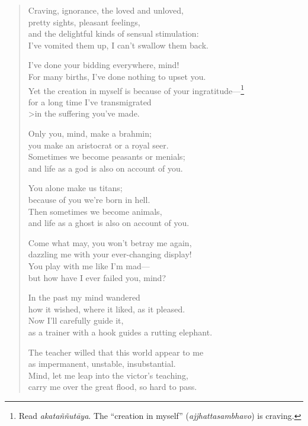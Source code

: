 \documentclass[12pt,openany]{book}%
\begin{document}
\begin{verse}
Craving, ignorance, the loved and unloved, \\
pretty sights, pleasant feelings, \\
and the delightful kinds of sensual stimulation: \\
I’ve vomited them up, I can’t swallow them back. 

I’ve done your bidding everywhere, mind! \\
For many births, I’ve done nothing to upset you. \\
Yet the creation in myself is because of your ingratitude—\footnote{Read \textit{\textsanskrit{akataññutāya}}. The “creation in myself” (\textit{ajjhattasambhavo}) is craving. } \\
for a long time I’ve transmigrated \\>in the suffering you’ve made. 

Only you, mind, make a brahmin; \\
you make an aristocrat or a royal seer. \\
Sometimes we become peasants or menials; \\
and life as a god is also on account of you. 

You alone make us titans; \\
because of you we’re born in hell. \\
Then sometimes we become animals, \\
and life as a ghost is also on account of you. 

Come what may, you won’t betray me again, \\
dazzling me with your ever-changing display! \\
You play with me like I’m mad—\\
but how have I ever failed you, mind? 

In the past my mind wandered \\
how it wished, where it liked, as it pleased. \\
Now I’ll carefully guide it, \\
as a trainer with a hook guides a rutting elephant. 

The teacher willed that this world appear to me \\
as impermanent, unstable, insubstantial. \\
Mind, let me leap into the victor’s teaching, \\
carry me over the great flood, so hard to pass. 


\end{verse}
\end{document}
